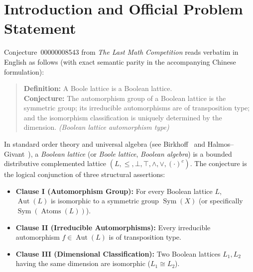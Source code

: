 \documentclass[11pt]{article}
\theoremstyle{definition}
\theoremstyle{remark}
\newcommand{\Aut}{\operatorname{Aut}}
\newcommand{\Sym}{\operatorname{Sym}}
\newcommand{\Atoms}{\operatorname{Atoms}}
\begin{document}
\section{Introduction and Official Problem Statement}

Conjecture~00000008543 from \emph{The Last Math Competition} reads verbatim in English as follows (with exact semantic parity in the accompanying Chinese formulation):
\begin{quote}
\textbf{Definition:} A Boole lattice is a Boolean lattice.\\
\textbf{Conjecture:} The automorphism group of a Boolean lattice is the symmetric group; its irreducible automorphisms are of transposition type; and the isomorphism classification is uniquely determined by the dimension. \emph{(Boolean lattice automorphism type)}
\end{quote}

In standard order theory and universal algebra (see Birkhoff~\cite{Birkhoff} and Halmos--Givant~\cite{HalmosGivant}), a \emph{Boolean lattice} (or \emph{Boole lattice}, \emph{Boolean algebra}) is a bounded distributive complemented lattice $(L, \le, \bot, \top, \wedge, \vee, (\cdot)^c)$. The conjecture is the logical conjunction of three structural assertions:
\begin{itemize}
  \item \textbf{Clause I (Automorphism Group):} For every Boolean lattice $L$, $\Aut(L)$ is isomorphic to a symmetric group $\Sym(X)$ (or specifically $\Sym(\Atoms(L))$).
  \item \textbf{Clause II (Irreducible Automorphisms):} Every irreducible automorphism $f \in \Aut(L)$ is of transposition type.
  \item \textbf{Clause III (Dimensional Classification):} Two Boolean lattices $L_1, L_2$ having the same dimension are isomorphic ($L_1 \cong L_2$).
\end{itemize}
\end{document}
